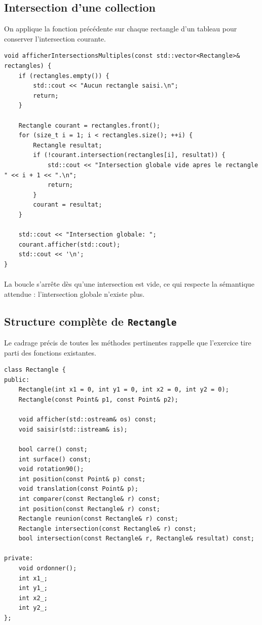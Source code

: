 \documentclass[12pt,a4paper]{article}
\begin{document}
\subsection{Intersection d'une collection}
On applique la fonction pr\'ec\'edente sur chaque rectangle d'un tableau pour conserver l'intersection courante.
\begin{lstlisting}[style=cppstyle]
void afficherIntersectionsMultiples(const std::vector<Rectangle>& rectangles) {
    if (rectangles.empty()) {
        std::cout << "Aucun rectangle saisi.\n";
        return;
    }

    Rectangle courant = rectangles.front();
    for (size_t i = 1; i < rectangles.size(); ++i) {
        Rectangle resultat;
        if (!courant.intersection(rectangles[i], resultat)) {
            std::cout << "Intersection globale vide apres le rectangle " << i + 1 << ".\n";
            return;
        }
        courant = resultat;
    }

    std::cout << "Intersection globale: ";
    courant.afficher(std::cout);
    std::cout << '\n';
}
\end{lstlisting}

\paragraph{}
La boucle s'arrête dès qu'une intersection est vide, ce qui respecte la sémantique attendue : l'intersection globale n'existe plus.

\subsection{Structure complète de \texttt{Rectangle}}
Le cadrage précis de toutes les méthodes pertinentes rappelle que l'exercice tire parti des fonctions existantes.
\begin{lstlisting}[style=cppstyle]
class Rectangle {
public:
    Rectangle(int x1 = 0, int y1 = 0, int x2 = 0, int y2 = 0);
    Rectangle(const Point& p1, const Point& p2);

    void afficher(std::ostream& os) const;
    void saisir(std::istream& is);

    bool carre() const;
    int surface() const;
    void rotation90();
    int position(const Point& p) const;
    void translation(const Point& p);
    int comparer(const Rectangle& r) const;
    int position(const Rectangle& r) const;
    Rectangle reunion(const Rectangle& r) const;
    Rectangle intersection(const Rectangle& r) const;
    bool intersection(const Rectangle& r, Rectangle& resultat) const;

private:
    void ordonner();
    int x1_;
    int y1_;
    int x2_;
    int y2_;
};
\end{lstlisting}
\end{document}
